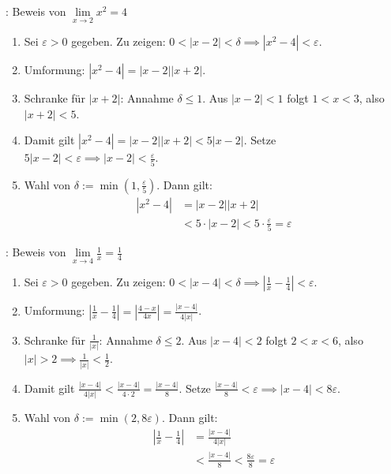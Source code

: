 \begin{minipage}{\linewidth}
\Bsp {}: Beweis von $\lim\limits_{x\to 2} x^2 = 4$
\begin{enumerate}
    \item Sei $\varepsilon > 0$ gegeben. Zu zeigen: $0 < |x - 2| < \delta \implies |x^2 - 4| < \varepsilon$.
    \item Umformung: $|x^2 - 4| = |x - 2||x + 2|$.
    \item Schranke für $|x + 2|$: Annahme $\delta \le 1$. Aus $|x - 2| < 1$ folgt $1 < x < 3$, also $|x + 2| < 5$.
    \item Damit gilt $|x^2 - 4| = |x - 2||x + 2| < 5|x - 2|$. Setze $5|x - 2| < \varepsilon \implies |x - 2| < \frac{\varepsilon}{5}$.
    \item Wahl von $\delta := \min\left(1, \frac{\varepsilon}{5}\right)$. Dann gilt:
    \begin{align*}
        |x^2 - 4| &= |x - 2||x + 2| \\[-0.4em]
                  &< 5 \cdot |x - 2| < 5 \cdot \frac{\varepsilon}{5} = \varepsilon
    \end{align*}
\end{enumerate}
\end{minipage}

\begin{minipage}{\linewidth}
\Bsp {}: Beweis von $\lim\limits_{x\to 4} \frac{1}{x} = \frac{1}{4}$
\begin{enumerate}
    \item Sei $\varepsilon > 0$ gegeben. Zu zeigen: $0 < |x - 4| < \delta \implies \left|\frac{1}{x} - \frac{1}{4}\right| < \varepsilon$.
    \item Umformung: $\left|\frac{1}{x} - \frac{1}{4}\right| = \left|\frac{4 - x}{4x}\right| = \frac{|x - 4|}{4|x|}$.
    \item Schranke für $\frac{1}{|x|}$: Annahme $\delta \le 2$. Aus $|x - 4| < 2$ folgt $2 < x < 6$, also $|x| > 2 \implies \frac{1}{|x|} < \frac{1}{2}$.
    \item Damit gilt $\frac{|x - 4|}{4|x|} < \frac{|x - 4|}{4 \cdot 2} = \frac{|x - 4|}{8}$. Setze $\frac{|x - 4|}{8} < \varepsilon \implies |x - 4| < 8\varepsilon$.
    \item Wahl von $\delta := \min(2, 8\varepsilon)$. Dann gilt:
    \begin{align*}
        \left|\frac{1}{x} - \frac{1}{4}\right| &= \frac{|x - 4|}{4|x|} \\[-0.4em]
                                                &< \frac{|x - 4|}{8} < \frac{8\varepsilon}{8} = \varepsilon
    \end{align*}
\end{enumerate}
\end{minipage}

